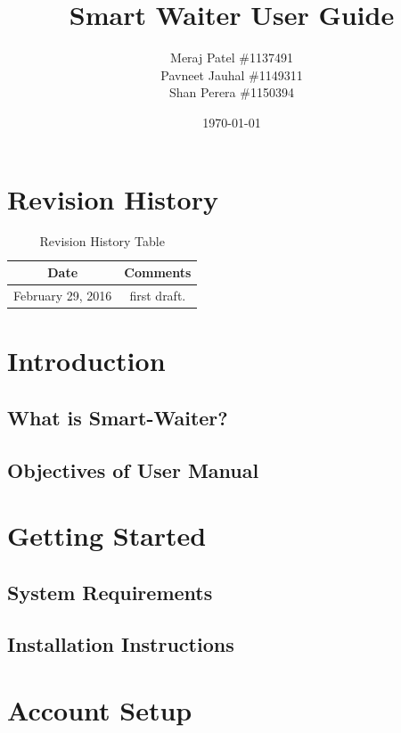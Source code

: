 \documentclass[12pt, titlepage]{article}
\begin{document}
\title{Smart Waiter User Guide} 
\author{Meraj Patel \#1137491 \\ Pavneet Jauhal \#1149311\\ Shan Perera \#1150394}
\date{\today}
\maketitle

\tableofcontents 

\listoffigures

\listoftables

\begin{table}[H]
\section*{Revision History}
\begin{tabular}{|c|c|}
\hline
\textbf{Date}  & \textbf{Comments} \\ \hline
February 29, 2016 &  first draft. \\ 
\hline
\end{tabular}
\caption{Revision History Table}
\end{table}

\section{Introduction}
\subsection{What is Smart-Waiter?}
\subsection{Objectives of User Manual}

\section{Getting Started }
\subsection{System Requirements}
\subsection{Installation Instructions}

\section{Account Setup}
\end{document}
